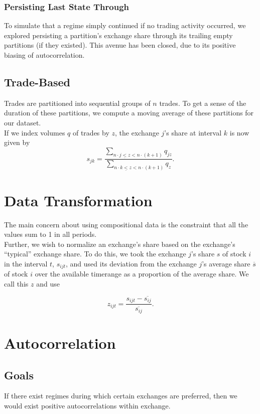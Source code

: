 \documentclass{article}
\begin{document}
\subsubsection{Persisting Last State Through} \label{persistempty}
To simulate that a regime simply continued if no trading activity occurred, we explored persisting a partition's exchange share through its trailing empty partitions (if they existed). This avenue has been closed, due to its positive biasing of autocorrelation.\\

\subsection{Trade-Based}
Trades are partitioned into sequential groups of $n$ trades. To get a sense of the duration of these partitions, we compute a moving average of these partitions for our dataset.\\

If we index volumes $q$ of trades by $z$, the exchange $j$'s share at interval $k$ is now given by
$$s_{jk} = \frac{\sum_{n \cdot j \underline{<} z < n \cdot (k+1)} q_{jz}}{\sum_{n \cdot k \underline{<} z < n \cdot (k+1)}q_{z}}.$$

\section{Data Transformation}
The main concern about using compositional data is the constraint that all the values sum to 1 in all periods.\\

Further, we wish to normalize an exchange's share based on the exchange's ``typical'' exchange share. To do this, we took the exchange $j$'s share $s$ of stock $i$ in the interval $t$, $s_{ijt}$, and used its deviation from the exchange $j$'s average share $\overline{s}$ of stock $i$ over the available timerange as a proportion of the average share. We call this $z$ and use

$$z_{ijt} = \frac{s_{ijt} - \overline{s_{ij}}}{\overline{s_{ij}}}.$$

\section{Autocorrelation}
\subsection{Goals}
If there exist regimes during which certain exchanges are preferred, then we would exist positive autocorrelations within exchange.\\
\end{document}
